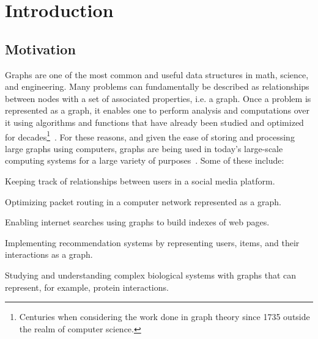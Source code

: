 %

\chapter{Introduction}



\section{Motivation}

Graphs are one of the most common and useful data structures in math, science, and engineering. Many problems can fundamentally be described as relationships between nodes with a set of associated properties, i.e. a graph. Once a problem is represented as a graph, it enables one to perform analysis and computations over it using algorithms and functions that have already been studied and optimized for decades\footnote{Centuries when considering the work done in graph theory since 1735 outside the realm of computer science.}~\cite{wiki:graph_theory}. For these reasons, and given the ease of storing and processing large graphs using computers, graphs are being used in today's large-scale computing systems for a large variety of purposes~\cite{survery:graph_processing_on_gpu, paper:gunrock, wiki:graph_theory}. Some of these include:
\begin{enumerate*}
    \item Keeping track of relationships between users in a social media platform.
    \item Optimizing packet routing in a computer network represented as a graph.
    \item Enabling internet searches using graphs to build indexes of web pages.%
    \item Implementing recommendation systems by representing users, items, and their interactions as a graph.
    \item Studying and understanding complex biological systems with graphs that can represent, for example, protein interactions. %
\end{enumerate*}

